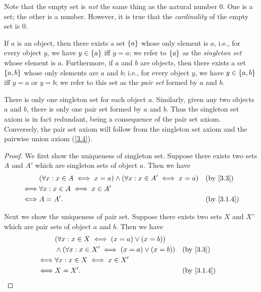 \begin{rmk}\label{3.1.8}
	Note that the empty set is \emph{not} the same thing as the natural number \(0\).
	One is a set;
	the other is a number.
	However, it is true that the \emph{cardinality} of the empty set is \(0\).
\end{rmk}

\begin{ax}\label{3.3}
	If \(a\) is an object, then there exists a set \(\left\lbrace a\right\rbrace\) whose only element is \(a\), i.e., for every object \(y\), we have \(y \in \left\lbrace a\right\rbrace\) iff \(y = a\);
	we refer to \(\left\lbrace a\right\rbrace\) as the \emph{singleton set} whose element is \(a\).
	Furthermore, if \(a\) and \(b\) are objects, then there exists a set \(\left\lbrace a, b\right\rbrace\) whose only elements are \(a\) and \(b\);
	i.e., for every object \(y\), we have \(y \in \left\lbrace a, b\right\rbrace\) iff \(y = a\) or \(y = b\);
	we refer to this set as the \emph{pair set} formed by \(a\) and \(b\).
\end{ax}

\begin{rmk}\label{3.1.9}
	There is only one singleton set for each object \(a\).
	Similarly, given any two objects \(a\) and \(b\), there is only one pair set formed by \(a\) and \(b\).
	Thus the singleton set axiom is in fact redundant, being a consequence of the pair set axiom.
	Conversely, the pair set axiom will follow from the singleton set axiom and the pairwise union axiom (\cref{3.4}).
\end{rmk}

\begin{proof}
	We first show the uniqueness of singleton set.
	Suppose there exists two sets \(A\) and \(A'\) which are singleton sets of object \(a\).
	Then we have
	\begin{align*}
		     & (\forall x : x \in A \iff x = a) \land (\forall x : x \in A' \iff x = a) &  & \by{3.3}   \\
		\iff & \forall x : x \in A \iff x \in A'                                                        \\
		\iff & A = A'.                                                                  &  & \by{3.1.4}
	\end{align*}

	Next we show the uniqueness of pair set.
	Suppose there exists two sets \(X\) and \(X'\) which are pair sets of object \(a\) and \(b\).
	Then we have
	\begin{align*}
		     & (\forall x : x \in X \iff (x = a) \lor (x = b))                        \\
		     & \land (\forall x : x \in X' \iff (x = a) \lor (x = b)) &  & \by{3.3}   \\
		\iff & \forall x : x \in X \iff x \in X'                                      \\
		\iff & X = X'.                                                &  & \by{3.1.4}
	\end{align*}
\end{proof}

